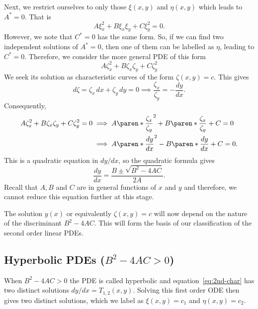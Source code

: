 \documentclass[11pt]{penrose}
\begin{document}
Next, we restrict ourselves to only those $\xi(x,y)$ and $\eta(x,y)$ which leads to $A^* = 0$. That is
\begin{equation}
    A \xi_x^2 + B \xi_x \xi_y + C \xi_y^2 = 0.
\end{equation}
However, we note that $C^* = 0$ has the same form. So, if we can find two independent solutions of $A^* = 0$, then one of them can be labelled as $\eta$, leading to $C^* = 0$. Therefore, we consider the more general PDE of this form
\begin{equation}
    A \zeta_x^2 + B \zeta_x \zeta_y + C \zeta_y^2
\end{equation}
We seek its solution as characteristic curves of the form $\zeta(x,y) = c$. This gives
\begin{equation}
    d\zeta = \zeta_x \,dx + \zeta_y \,dy = 0
    \implies
    \frac{\zeta_x}{\zeta_y} = - \frac{dy}{dx}.
\end{equation}
Consequently,
\begin{align}
    A \zeta_x^2 + B \zeta_x \zeta_y + C \zeta_y^2 = 0
    &\implies
    A \paren*{\frac{\zeta_x}{\zeta_y}}^2 + B \paren*{\frac{\zeta_x}{\zeta_y}} + C = 0\\
    &\implies
    A \paren*{\frac{dy}{dx}}^2 - B \paren*{\frac{dy}{dx}} + C = 0.
\end{align}
This is a quadratic equation in $dy/dx$, so the quadratic formula gives
\begin{equation}
    \frac{dy}{dx} = \frac{B \pm \sqrt{B^2 - 4AC}}{2A}.
    \label{eq:2nd-char}
\end{equation}
Recall that $A, B$ and $C$ are in general functions of $x$ and $y$ and therefore, we cannot reduce this equation further at this stage.

The solution $y(x)$ or equivalently $\zeta(x,y) = c$ will now depend on the nature of the discriminant $B^2 - 4AC$. This will form the basis of our classification of the second order linear PDEs.

\subsection{Hyperbolic PDEs \texorpdfstring{($B^2 - 4AC > 0$)}{B2 - 4AC > 0}}
When $B^2 - 4AC > 0$ the PDE is called hyperbolic and equation~\eqref{eq:2nd-char} has two distinct solutions $dy/dx = T_{1,2}(x,y)$. Solving this first order ODE then gives two distinct solutions, which we label as $\xi(x,y) = c_1$ and $\eta(x,y) = c_2$.
\end{document}
